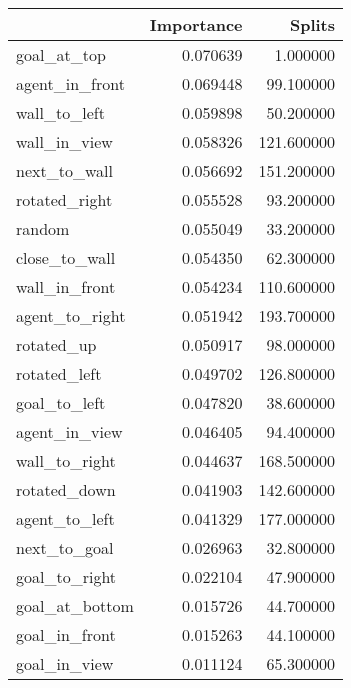 \begin{tabular}{lrr}
\toprule
 & Importance & Splits \\
\midrule
goal\_at\_top & 0.070639 & 1.000000 \\
agent\_in\_front & 0.069448 & 99.100000 \\
wall\_to\_left & 0.059898 & 50.200000 \\
wall\_in\_view & 0.058326 & 121.600000 \\
next\_to\_wall & 0.056692 & 151.200000 \\
rotated\_right & 0.055528 & 93.200000 \\
random & 0.055049 & 33.200000 \\
close\_to\_wall & 0.054350 & 62.300000 \\
wall\_in\_front & 0.054234 & 110.600000 \\
agent\_to\_right & 0.051942 & 193.700000 \\
rotated\_up & 0.050917 & 98.000000 \\
rotated\_left & 0.049702 & 126.800000 \\
goal\_to\_left & 0.047820 & 38.600000 \\
agent\_in\_view & 0.046405 & 94.400000 \\
wall\_to\_right & 0.044637 & 168.500000 \\
rotated\_down & 0.041903 & 142.600000 \\
agent\_to\_left & 0.041329 & 177.000000 \\
next\_to\_goal & 0.026963 & 32.800000 \\
goal\_to\_right & 0.022104 & 47.900000 \\
goal\_at\_bottom & 0.015726 & 44.700000 \\
goal\_in\_front & 0.015263 & 44.100000 \\
goal\_in\_view & 0.011124 & 65.300000 \\
\bottomrule
\end{tabular}